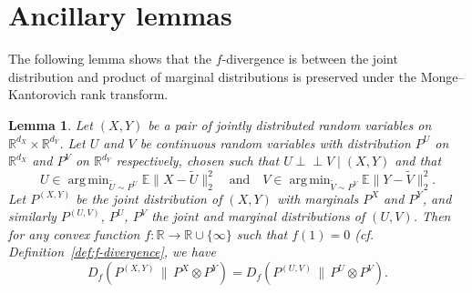 \documentclass[11pt]{article}
\newtheorem{lemma}[thm]{Lemma}
\DeclareMathOperator*{\argmin}{arg\,min}
\newcommand{\indep}{\perp\!\!\!\perp}
\begin{document}
\section{Ancillary lemmas}
The following lemma shows that the $f$-divergence is between the joint distribution and product of marginal distributions is preserved under the Monge--Kantorovich rank transform.

\begin{lemma}
    \label{Lemma:DataProcessing}
    Let $(X,Y)$ be a pair of jointly distributed random variables on $\mathbb{R}^{d_X}\times\mathbb{R}^{d_Y}$. Let $U$ and $V$ be continuous random variables with distribution $P^U$ on $\mathbb{R}^{d_X}$ and $P^V$ on $\mathbb{R}^{d_Y}$ respectively, chosen such that $U\indep V\mid(X,Y)$ and that 
    \begin{equation}
    \label{Eq:DataProcessingCoupling}
    U\in\argmin_{\tilde U\sim P^U} \mathbb{E}\|X-\tilde U\|_2^2\quad \text{and}\quad V\in\argmin_{\tilde V\sim P^V}\mathbb{E}\|Y - \tilde V\|_2^2.
    \end{equation}
    Let $P^{(X,Y)}$ be the joint distribution of $(X,Y)$ with marginals $P^X$ and $P^Y$, and similarly $P^{(U,V)}$, $P^U$, $P^V$ the joint and marginal distributions of $(U,V)$. Then for any convex function $f:\mathbb{R}\to \mathbb{R}\cup\{\infty\}$ such that $f(1)=0$ (cf. Definition~\ref{def:f-divergence}, we have
    \[ 
    D_f(P^{(X,Y)}\,\|\,P^X\otimes P^Y) = D_f(P^{(U,V)}\,\|\,P^U\otimes P^V).
    \]
\end{lemma}
\end{document}

